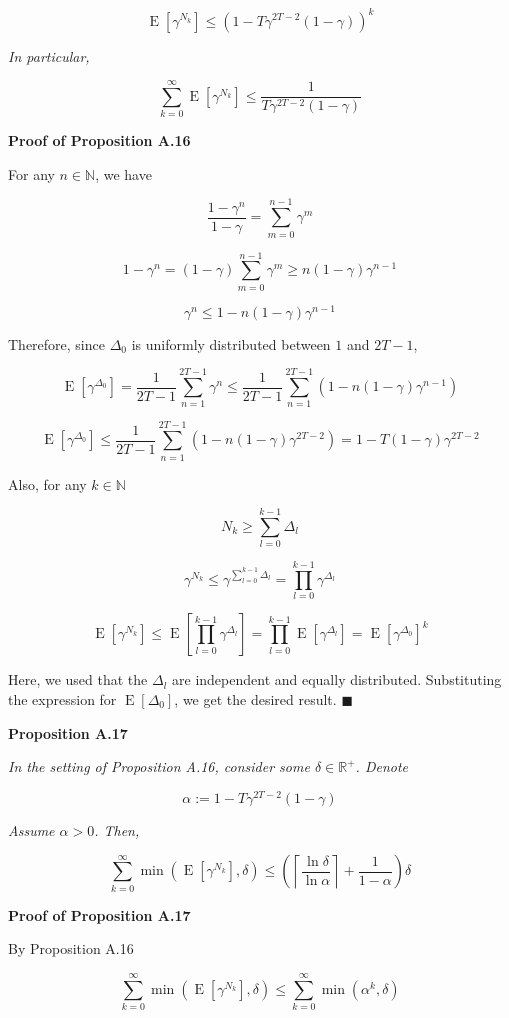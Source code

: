 \documentclass[a4paper]{article}
\newcommand{\Co}[1]{}
\newcommand{\AP}[1]{\left(#1\right)}
\newcommand{\AB}[1]{\left[#1\right]}
\newcommand{\Ceil}[1]{\left\lceil #1 \right\rceil}
\newcommand{\E}[1]{\operatorname{E}\AB{#1}}
\newcommand{\Nats}{\mathbb{N}}
\newcommand{\Reals}{\mathbb{R}}
\begin{document}
$$\E{\gamma^{N_k}}\leq\AP{1-T\gamma^{2T-2}(1-\gamma)}^k$$

\textit{In particular,}\Co{i}

$$\sum_{k=0}^\infty\E{\gamma^{N_k}}\leq\frac{1}{T\gamma^{2T-2}(1-\gamma)}$$

\textbf{Proof of Proposition A.16}\Co{b}

For any $n\in\Nats$, we have

$$\frac{1-\gamma^n}{1-\gamma}=\sum_{m=0}^{n-1}\gamma^m$$

$$1-\gamma^n=(1-\gamma)\sum_{m=0}^{n-1}\gamma^m\geq n(1-\gamma)\gamma^{n-1}$$

$$\gamma^n\leq1-n(1-\gamma)\gamma^{n-1}$$

Therefore, since $\Delta_0$ is uniformly distributed between $1$ and $2T-1$,

$$\E{\gamma^{\Delta_0}}=\frac{1}{2T-1}\sum_{n=1}^{2T-1}\gamma^n\leq\frac{1}{2T-1}\sum_{n=1}^{2T-1}\AP{1-n(1-\gamma)\gamma^{n-1}}$$

$$\E{\gamma^{\Delta_0}}\leq\frac{1}{2T-1}\sum_{n=1}^{2T-1}\AP{1-n(1-\gamma)\gamma^{2T-2}}=1-T(1-\gamma)\gamma^{2T-2}$$

Also, for any $k\in\Nats$

$$N_k\geq\sum_{l=0}^{k-1}\Delta_l$$

$$\gamma^{N_k}\leq\gamma^{\sum_{l=0}^{k-1}\Delta_l}=\prod_{l=0}^{k-1}\gamma^{\Delta_l}$$

$$\E{\gamma^{N_k}}\leq\E{\prod_{l=0}^{k-1}\gamma^{\Delta_l}}=\prod_{l=0}^{k-1}\E{\gamma^{\Delta_l}}=\E{\gamma^{\Delta_0}}^k$$

Here, we used that the $\Delta_l$ are independent and equally distributed. Substituting the expression for $\E{\Delta_0}$, we get the desired result. $\blacksquare$

\textbf{Proposition A.17}\Co{b}

\textit{In the setting of Proposition A.16, consider some $\delta\in\Reals^+$. Denote}\Co{i}

$$\alpha:=1-T\gamma^{2T-2}(1-\gamma)$$

\textit{Assume $\alpha>0$. Then,}\Co{i}

$$\sum_{k=0}^\infty\min\AP{\E{\gamma^{N_k}},\delta}\leq\AP{\Ceil{\frac{\ln\delta}{\ln\alpha}}+\frac{1}{1-\alpha}}\delta$$

\textbf{Proof of Proposition A.17}\Co{b}

By Proposition A.16

$$\sum_{k=0}^\infty\min\AP{\E{\gamma^{N_k}},\delta}\leq\sum_{k=0}^\infty\min\AP{\alpha^k,\delta}$$
\end{document}
